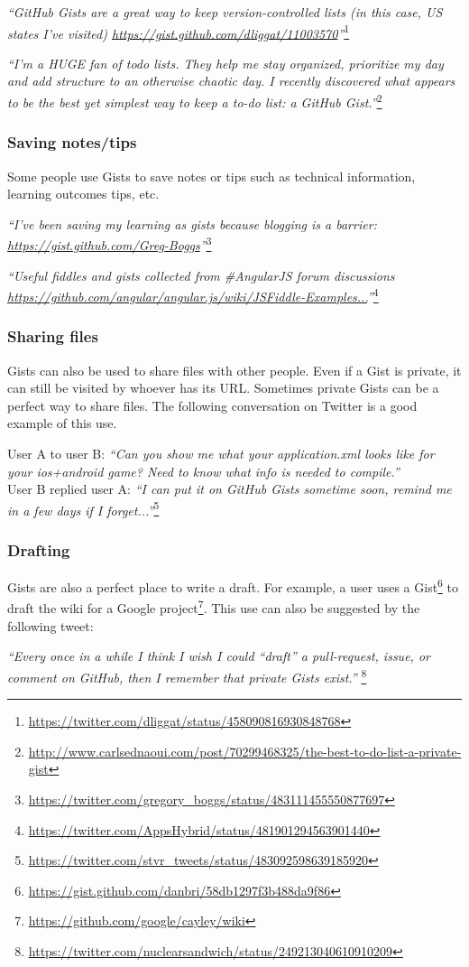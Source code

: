 \textsl{``GitHub Gists are a great way to keep version-controlled lists (in this case, US states I've visited) \url{https://gist.github.com/dliggat/11003570}''}\footnote{\url{https://twitter.com/dliggat/status/458090816930848768}}

\textsl{``I’m a HUGE fan of todo lists. They help me stay organized, prioritize my day and add structure to an otherwise chaotic day. I recently discovered what appears to be the best yet simplest way to keep a to-do list: a GitHub Gist.''}\footnote{\url{http://www.carlsednaoui.com/post/70299468325/the-best-to-do-list-a-private-gist}}

\subsubsection{Saving notes/tips}

Some people use Gists to save notes or tips such as technical information, learning outcomes tips, etc. 

\textsl{``I've been saving my learning as gists because blogging is a barrier: \url{https://gist.github.com/Greg-Boggs}''}\footnote{\url{https://twitter.com/gregory_boggs/status/483111455550877697}}

\textsl{``Useful fiddles and gists collected from \#AngularJS forum discussions \url{https://github.com/angular/angular.js/wiki/JSFiddle-Examples...}''}\footnote{\url{https://twitter.com/AppsHybrid/status/481901294563901440}}

\subsubsection{Sharing files}

Gists can also be used to share files with other people. Even if a Gist is private, it can still be visited by whoever has its URL. Sometimes private Gists can be a perfect way to share files. The following conversation on Twitter is a good example of this use.

\noindent User A to user B: \textsl{``Can you show me what your application.xml looks like for your ios+android game? Need to know what info is needed to compile.''}\\
User B replied user A: \textsl{``I can put it on GitHub Gists sometime soon, remind me in a few days if I forget...''}\footnote{\url{https://twitter.com/stvr_tweets/status/483092598639185920}}

\subsubsection{Drafting}

Gists are also a perfect place to write a draft. For example, a user uses a Gist\footnote{\url{https://gist.github.com/danbri/58db1297f3b488da9f86}} to draft the wiki for a Google project\footnote{\url{https://github.com/google/cayley/wiki}}. This use can also be suggested by the following tweet: 

\textsl{``Every once in a while I think I wish I could ``draft'' a pull-request, issue, or comment on GitHub, then I remember that private Gists exist.''} \footnote{\url{https://twitter.com/nuclearsandwich/status/249213040610910209}}
